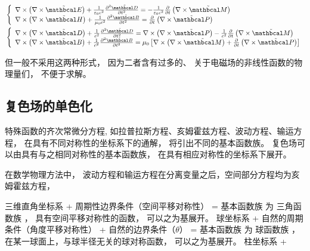 {\setlength\abovedisplayskip{0pt} %
	\setlength\belowdisplayskip{0pt}
	\begin{align}
		&\left\{ \begin{array}{l}
			\nabla  \times \left( {\nabla  \times \tilde {\mathbcal E}} \right) + \frac{1}{{{\varepsilon _0}{c^2}}}\frac{{{\partial ^2}\tilde {\mathbcal D}}}{{\partial {t^2}}} =  - \frac{1}{{{\varepsilon _0}{c^2}}}\frac{\partial }{{\partial t}}\left( {\nabla  \times \tilde {\mathbcal M}} \right)\\
			\nabla  \times \left( {\nabla  \times \tilde {\mathbcal H}} \right) + \frac{1}{{{\mu _0}{c^2}}}\frac{{{\partial ^2}\tilde {\mathbcal B}}}{{\partial {t^2}}} = \frac{\partial }{{\partial t}}\left( {\nabla  \times \tilde {\mathbcal P}} \right)
			\end{array} \right.\\
		&\left\{ \begin{array}{l}
			\nabla  \times \left( {\nabla  \times \tilde {\mathbcal D}} \right) + \frac{1}{{{c^2}}}\frac{{{\partial ^2}\tilde {\mathbcal D}}}{{\partial {t^2}}} = \nabla  \times \left( {\nabla  \times \tilde {\mathbcal P}} \right) - \frac{1}{{{c^2}}}\frac{\partial }{{\partial t}}\left( {\nabla  \times \tilde {\mathbcal M}} \right)\\
			\nabla  \times \left( {\nabla  \times \tilde {\mathbcal B}} \right) + \frac{1}{{{c^2}}}\frac{{{\partial ^2}\tilde {\mathbcal B}}}{{\partial {t^2}}} = {\mu _0}\left[ {\nabla  \times \left( {\nabla  \times \tilde {\mathbcal M}} \right) + \frac{\partial }{{\partial t}}\left( {\nabla  \times \tilde {\mathbcal P}} \right)} \right]
			\end{array} \right.
	\end{align}
}

但一般不采用这两种形式， 因为二者含有过多的、 关于电磁场的非线性函数的物理量们， 不便于求解。

\subsection{复色场的单色化}

特殊函数的齐次常微分方程, 如拉普拉斯方程、亥姆霍兹方程、波动方程、输运方程， 
在具有不同对称性的坐标系下的通解， 将引出不同的基本函数族。
复色场可以由具有与之相同对称性的基本函数族， 在具有相应对称性的坐标系下展开。

在数学物理方法中，
波动方程和输运方程在分离变量之后，空间部分方程均为亥姆霍兹方程， 

三维直角坐标系 + 周期性边界条件（空间平移对称性） = 基本函数族 为 三角函数族 ， 具有空间平移对称性的函数， 可以之为基展开。
球坐标系 + 自然的周期条件（角度平移对称性） + 自然的边界条件（$ \theta $） = 基本函数族 为 球函数族 ， 在某一球面上，与球半径无关的球对称函数， 可以之为基展开。
柱坐标系 + 

